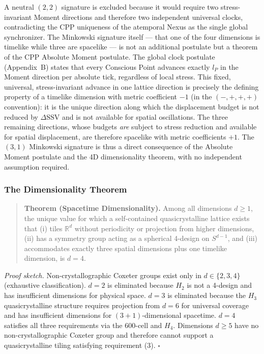 \documentclass[11pt,letterpaper]{article}
\begin{document}
A neutral $(2,2)$ signature is excluded because it would require two stress-invariant Moment directions and therefore two independent universal clocks, contradicting the CPP uniqueness of the atemporal Nexus as the single global synchronizer. The Minkowski signature itself — that one of the four dimensions is
timelike while three are spacelike — is not an additional postulate
but a theorem of the CPP Absolute Moment postulate. The global clock 
postulate (Appendix~B) states that every Conscious Point advances 
exactly $l_P$ in the Moment direction per absolute tick, regardless 
of local stress. This fixed, universal, stress-invariant advance in 
one lattice direction is precisely the defining property of a 
timelike dimension with metric coefficient $-1$ (in the $(-,+,+,+)$ 
convention): it is the unique direction along which the displacement 
budget is not reduced by $\Delta\text{SSV}$ and is not available for 
spatial oscillations. The three remaining directions, whose budgets 
\emph{are} subject to stress reduction and available for spatial 
displacement, are therefore spacelike with metric coefficients 
$+1$. The $(3,1)$ Minkowski signature is thus a direct consequence 
of the Absolute Moment postulate and the 4D dimensionality theorem, 
with no independent assumption required.

\subsubsection{The Dimensionality Theorem}

\begin{quote}
\textbf{Theorem (Spacetime Dimensionality).} Among all dimensions 
$d \geq 1$, the unique value for which a self-contained 
quasicrystalline lattice exists that (i) tiles $\mathbb{R}^d$ 
without periodicity or projection from higher dimensions, (ii) has 
a symmetry group acting as a spherical 4-design on $S^{d-1}$, and 
(iii) accommodates exactly three spatial dimensions plus one 
timelike dimension, is $d = 4$.
\end{quote}

\textit{Proof sketch.} Non-crystallographic Coxeter groups exist 
only in $d \in \{2, 3, 4\}$ (exhaustive classification). $d = 2$ 
is eliminated because $H_2$ is not a 4-design and has insufficient 
dimensions for physical space. $d = 3$ is eliminated because the 
$H_3$ quasicrystalline structure requires projection from $d = 6$ 
for universal coverage and has insufficient dimensions for 
$(3+1)$-dimensional spacetime. $d = 4$ satisfies all three 
requirements via the 600-cell and $H_4$. Dimensions $d \geq 5$ 
have no non-crystallographic Coxeter group and therefore cannot 
support a quasicrystalline tiling satisfying requirement (3). 
\hfill$\square$
\end{document}
